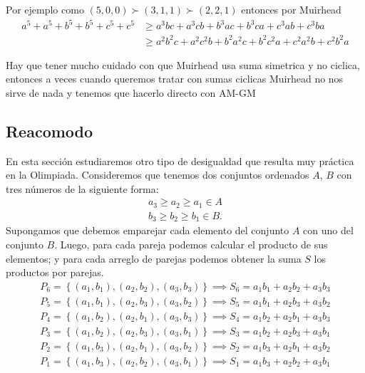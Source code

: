 \documentclass[11pt]{scrartcl}
\begin{document}
Por ejemplo como $(5,0,0) \succ (3,1,1) \succ (2,2,1)$ entonces por Muirhead
\begin{align*} 
    a^5+a^5+b^5+b^5+c^5+c^5 &\geq a^3bc+a^3cb+b^3ac+b^3ca+c^3ab+c^3ba \\ 
    &\geq a^2b^2c+a^2c^2b+b^2a^2c+b^2c^2a+c^2a^2b+c^2b^2a
\end{align*}

\begin{remark}
    Hay que tener mucho cuidado con que Muirhead usa suma simetrica y no ciclica, entonces a veces cuando queremos tratar con sumas ciclicas Muirhead no nos sirve de nada y tenemos que hacerlo directo con AM-GM
\end{remark}

\subsection{Reacomodo}
\noindent
En esta secci\'on estudiaremos otro tipo de desigualdad que resulta muy pr\'actica en la Olimpiada. Consideremos que tenemos dos conjuntos ordenados $A$, $B$ con tres n\'umeros de la siguiente forma:
\begin{eqnarray*}
    a_3 \geq a_2 \geq a_1 \in A\\
    b_3 \geq b_2 \geq b_1 \in B.
\end{eqnarray*}
Supongamos que debemos emparejar cada elemento del conjunto $A$ con uno del conjunto $B$. Luego, para cada pareja podemos calcular el producto de sus elementos; y para cada arreglo de parejas podemos obtener la suma $S$ los productos por parejas. 
\begin{eqnarray*}
    P_6 = \left\{\left(a_1, b_1\right), \left(a_2, b_2\right), \left(a_3, b_3\right)\right\} \implies S_6 = a_1b_1 + a_2b_2 + a_3b_3\\
    P_5 = \left\{\left(a_1, b_1\right), \left(a_2, b_3\right), \left(a_3, b_2\right)\right\} \implies S_5 = a_1b_1 + a_2b_3 + a_3b_2\\
    P_4 = \left\{\left(a_1, b_2\right), \left(a_2, b_1\right), \left(a_3, b_3\right)\right\} \implies S_4 = a_1b_2 + a_2b_1 + a_3b_3\\
    P_3 = \left\{\left(a_1, b_2\right), \left(a_2, b_3\right), \left(a_3, b_1\right)\right\} \implies S_3 = a_1b_2 + a_2b_3 + a_3b_1\\
    P_2 = \left\{\left(a_1, b_3\right), \left(a_2, b_1\right), \left(a_3, b_2\right)\right\} \implies S_2 = a_1b_3 + a_2b_1 + a_3b_2\\
    P_1 = \left\{\left(a_1, b_3\right), \left(a_2, b_2\right), \left(a_3, b_1\right)\right\} \implies S_1 = a_1b_3 + a_2b_2 + a_3b_1\\
\end{eqnarray*}
\end{document}
